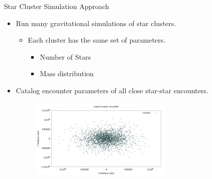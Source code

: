 \documentclass{beamer}
\begin{document}
\begin{frame}{Star Cluster Simulation Approach}
    \begin{itemize}
        \item Run many gravitational simulations of star clusters.
            \begin{itemize}
                \item Each cluster has the same set of parameters.
                \begin{itemize}
                    \item Number of Stars
                    \item Mass distribution
                \end{itemize}
            \end{itemize}
        \item Catalog encounter parameters of all close star-star encounters.
        \begin{figure}
            \includegraphics[height=1.5in]{cluster1.png}
        \end{figure}
    \end{itemize}
\end{frame}
\end{document}
